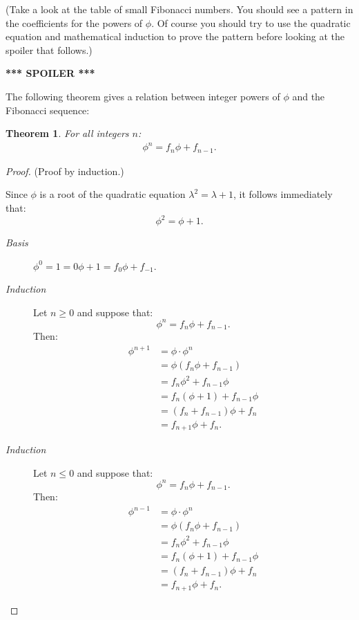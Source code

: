 \documentclass[12pt,letterpaper,reqno]{amsart}
\newtheorem{theorem}{Theorem}
\numberwithin{equation}{section}
\numberwithin{theorem}{section}
\numberwithin{table}{section}
\begin{document}
(Take a look at the table of small Fibonacci numbers.  You should see a pattern in the coefficients for the powers of $\phi$.  Of course you should try to use the quadratic equation and mathematical induction to prove the pattern before looking at the spoiler that follows.)

\begin{center}
	\textbf{*** SPOILER ***}
\end{center}

The following theorem gives a relation between integer powers of $\phi$ and the Fibonacci sequence:

\begin{theorem}
	For all integers $n$:
	\begin{align}
		\phi^{n} = f_{n} \phi + f_{n-1} \text{.}
	\end{align}
\end{theorem}

\begin{proof}
	(Proof by induction.)
	
	Since $\phi$ is a root of the quadratic equation $\lambda^2=\lambda+1$, it follows immediately
	that:
		\[ \phi^2 = \phi + 1 \text{.}\]
	\begin{description}
		\item[\it Basis] $\phi^0 = 1 = 0\phi + 1 = f_0\phi + f_{-1}$.
		\item[\it Induction] Let $n\geq 0$ and suppose that:
			\[ \phi^{n} = f_{n} \phi + f_{n-1} \text{.} \]
			Then:
			\begin{align}
				 \phi^{n+1} &= \phi \cdot \phi^{n} \\
				 	&= \phi (f_{n} \phi + f_{n-1}) \\
				 	&= f_{n} \phi^2 + f_{n-1}\phi \\
				 	&= f_{n} (\phi + 1) + f_{n-1}\phi \\
				 	&= (f_n + f_{n-1})\phi + f_n \\
				 	&= f_{n+1}\phi + f_n \text{.}
			\end{align}
		\item[\it Induction] Let $n\leq 0$ and suppose that:
			\[ \phi^{n} = f_{n} \phi + f_{n-1} \text{.} \]
			Then:
			\begin{align}
				\phi^{n-1} &= \phi \cdot \phi^{n} \\
				&= \phi (f_{n} \phi + f_{n-1}) \\
				&= f_{n} \phi^2 + f_{n-1}\phi \\
				&= f_{n} (\phi + 1) + f_{n-1}\phi \\
				&= (f_n + f_{n-1})\phi + f_n \\
				&= f_{n+1}\phi + f_n \text{.}
			\end{align}
	\end{description}
\end{proof}
\end{document}
